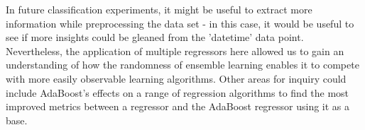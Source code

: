 \documentclass[11pt]{article}
\begin{document}
In future classification experiments, it might be useful to extract more information while preprocessing the data set - in this case, it would be useful to see if more insights could be gleaned from the 'datetime' data point. Nevertheless, the application of multiple regressors here allowed us to gain an understanding of how the randomness of ensemble learning enables it to compete with more easily observable learning algorithms.
Other areas for inquiry could include AdaBoost's effects on a range of regression algorithms to find the most improved metrics between a regressor and the AdaBoost regressor using it as a base.
\end{document}
